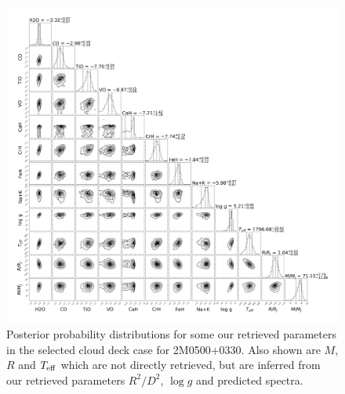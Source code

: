 \documentclass[useAMS,usenatbib]{mn2e}
\begin{document}
\begin{figure}
\hspace{-1.0cm}
\includegraphics[width=550pt]{2M0500_THICK_POW_post_corner_UCL.png}
\caption{Posterior probability distributions for some our retrieved parameters in the selected cloud deck case for 2M0500+0330. Also shown are $M$, $R$ and $T_{\rm eff}$ which are not directly retrieved, but are inferred from our retrieved parameters $R^2/D^2$, $\log g$ and predicted spectra. 
\label{fig:2m0500post}}
\end{figure}
\end{document}
